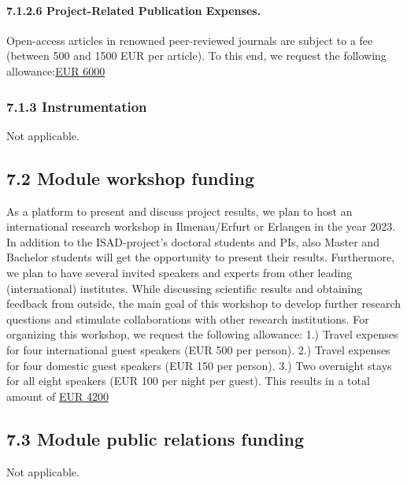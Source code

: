 \documentclass[11pt,a4paper]{article}
\def\PN{\mathrm{ISAD}}
\theoremstyle{plain} \newtheorem{define}{Definition}[section]
\begin{document}
\paragraph*{7.1.2.6	Project-Related Publication Expenses.} 
%
Open-access articles in renowned peer-reviewed journals are subject to a fee (between 500 and 1500 EUR per article). To this end, we request the following allowance:\hfill{\underline{EUR 6000}}
\vspace{-0.4cm}

\subsubsection*{7.1.3 Instrumentation}
%
\vspace{-0.4cm}
Not applicable.
\vspace{-0.4cm}

\subsection*{7.2 Module workshop funding}
%
\vspace{-0.4cm}
As a platform to present and discuss project results, we plan to host an international research workshop in 
Ilmenau/Erfurt or Erlangen in the year 2023. In addition to the $\PN$-project's doctoral students and PIs, also Master and Bachelor students will get the opportunity to present their results. Furthermore, we plan to have several invited speakers and experts from other leading (international) institutes. While discussing scientific results and obtaining feedback from outside, the main goal of this workshop to develop further research questions and stimulate collaborations with other research institutions. For organizing this workshop, we request the following allowance: 1.) Travel expenses for four international guest speakers (EUR 500 per person). 2.) Travel expenses for four domestic guest speakers (EUR 150 per person). 3.) Two overnight stays for all eight speakers (EUR 100 per night per guest). This results in a total amount of \hfill{\underline{EUR 4200}}


\subsection*{7.3 Module public relations funding}
%
\vspace{-0.4cm}
Not applicable.
\vspace{-0.4cm}
\end{document}
